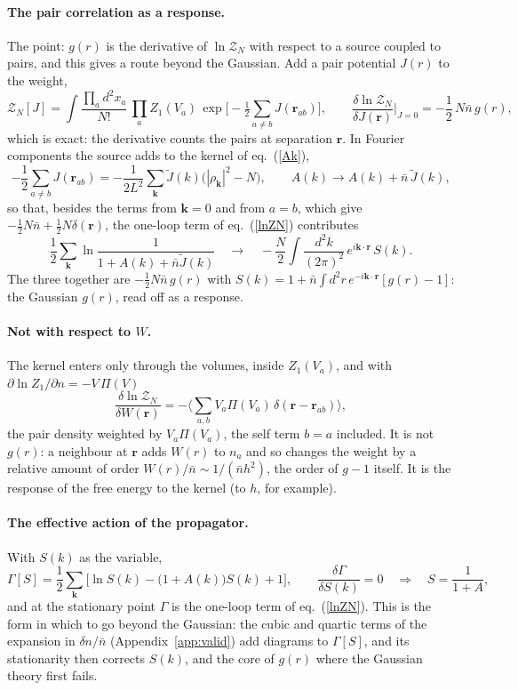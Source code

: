 \documentclass[11pt,aps,preprint,nofootinbib,superscriptaddress,tightenlines]{revtex4-2}
\def\st{\begin{equation}}
\def\stp{\end{equation}}
\def\Eq#1{eq.~(\ref{#1})}
\def\App#1{Appendix~\ref{#1}}
\let\oldparagraph\paragraph
\renewcommand{\paragraph}{\par\bigskip\oldparagraph}
\begin{document}
\paragraph{The pair correlation as a response.}  The point: $g(r)$ is the derivative of $\ln\mathcal Z_N$ with respect to a source coupled to pairs, and this
gives a route beyond the Gaussian.  Add a pair potential $J(r)$ to the weight,
\st
\mathcal Z_N[J]=\int\frac{\prod_ad^2x_a}{N!}\,\prod_aZ_1(V_a)\,\exp\Big[-\tfrac12\sum_{a\neq b}J(\bm r_{ab})\Big],\qquad
\frac{\delta\ln\mathcal Z_N}{\delta J(\bm r)}\Big|_{J=0}=-\frac12\,N\bar n\,g(r) ,
\label{gsource}
\stp
which is exact: the derivative counts the pairs at separation $\bm r$.  In Fourier components the source adds to the kernel of \Eq{Ak},
\st
-\frac12\sum_{a\neq b}J(\bm r_{ab})=-\frac1{2L^2}\sum_{\bm k}\widetilde J(k)\big(|\rho_{\bm k}|^2-N\big),\qquad A(k)\to A(k)+\bar n\,\widetilde J(k) ,
\stp
so that, besides the terms from $\bm k=0$ and from $a=b$, which give $-\tfrac12N\bar n+\tfrac12N\delta(\bm r)$, the one-loop term of \Eq{lnZN} contributes
\st
\frac12\sum_{\bm k}\ln\frac1{1+A(k)+\bar n\widetilde J(k)}\quad\longrightarrow\quad -\frac N2\int\frac{d^2k}{(2\pi)^2}\,e^{i\bm k\cdot\bm r}\,S(k) .
\stp
The three together are $-\tfrac12N\bar n\,g(r)$ with $S(k)=1+\bar n\int d^2r\,e^{-i\bm k\cdot\bm r}[g(r)-1]$: the Gaussian $g(r)$, read off as a response.

\paragraph{Not with respect to $W$.}  The kernel enters only through the volumes, inside $Z_1(V_a)$, and with $\partial\ln Z_1/\partial n=-V\,\Pi(V)$
\st
\frac{\delta\ln\mathcal Z_N}{\delta W(\bm r)}=-\Big\langle\sum_{a,b}V_a\Pi(V_a)\,\delta(\bm r-\bm r_{ab})\Big\rangle ,
\stp
the pair density weighted by $V_a\Pi(V_a)$, the self term $b=a$ included.  It is not $g(r)$: a neighbour at $\bm r$ adds $W(r)$ to $n_a$ and so changes the weight by
a relative amount of order $W(r)/\bar n\sim1/(\bar nh^2)$, the order of $g-1$ itself.  It is the response of the free energy to the kernel (to $h$, for example).

\paragraph{The effective action of the propagator.}  With $S(k)$ as the variable,
\st
\Gamma[S]=\frac12\sum_{\bm k}\Big[\ln S(k)-\big(1+A(k)\big)S(k)+1\Big],\qquad \frac{\delta\Gamma}{\delta S(k)}=0\quad\Longrightarrow\quad S=\frac1{1+A} ,
\stp
and at the stationary point $\Gamma$ is the one-loop term of \Eq{lnZN}.  This is the form in which to go beyond the Gaussian: the cubic and quartic terms of
the expansion in $\delta n/\bar n$ (\App{app:valid}) add diagrams to $\Gamma[S]$, and its stationarity then corrects $S(k)$, and the core of $g(r)$ where the
Gaussian theory first fails.
\end{document}

